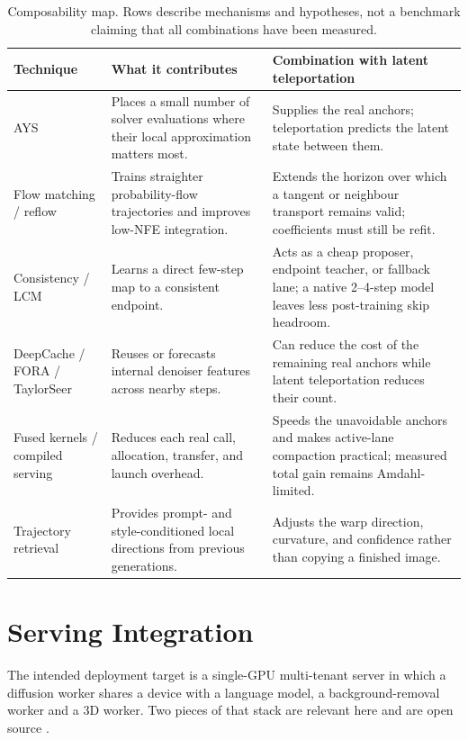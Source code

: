\documentclass[11pt,a4paper]{article}
\begin{document}
\begin{table}[ht]
\centering
\small
\begin{tabularx}{\textwidth}{@{}l>{\raggedright\arraybackslash}X>{\raggedright\arraybackslash}X@{}}
\toprule
\textbf{Technique} & \textbf{What it contributes} & \textbf{Combination with latent teleportation} \\
\midrule
AYS & Places a small number of solver evaluations where their local approximation matters most. & Supplies the real anchors; teleportation predicts the latent state between them. \\
Flow matching / reflow & Trains straighter probability-flow trajectories and improves low-NFE integration. & Extends the horizon over which a tangent or neighbour transport remains valid; coefficients must still be refit. \\
Consistency / LCM & Learns a direct few-step map to a consistent endpoint. & Acts as a cheap proposer, endpoint teacher, or fallback lane; a native 2--4-step model leaves less post-training skip headroom. \\
DeepCache / FORA / TaylorSeer & Reuses or forecasts internal denoiser features across nearby steps. & Can reduce the cost of the remaining real anchors while latent teleportation reduces their count. \\
Fused kernels / compiled serving & Reduces each real call, allocation, transfer, and launch overhead. & Speeds the unavoidable anchors and makes active-lane compaction practical; measured total gain remains Amdahl-limited. \\
Trajectory retrieval & Provides prompt- and style-conditioned local directions from previous generations. & Adjusts the warp direction, curvature, and confidence rather than copying a finished image. \\
\bottomrule
\end{tabularx}
\caption{Composability map. Rows describe mechanisms and hypotheses, not a
benchmark claiming that all combinations have been measured.}
\label{tab:composability}
\end{table}

\section{Serving Integration}

The intended deployment target is a single-GPU multi-tenant server in which a
diffusion worker shares a device with a language model, a background-removal
worker and a 3D worker. Two pieces of that stack are relevant here and are open
source \citep{omniservenative}.
\end{document}
